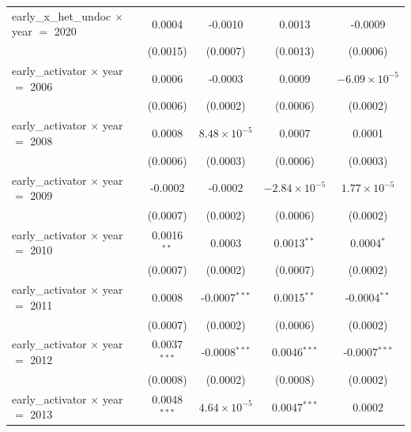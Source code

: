 \begin{tabular}{lcccc}
   early\_x\_het\_undoc $\times$ year $=$ 2020     & 0.0004             & -0.0010                   & 0.0013                 & -0.0009\\   
                                                   & (0.0015)           & (0.0007)                  & (0.0013)               & (0.0006)\\   
   early\_activator $\times$ year $=$ 2006         & 0.0006             & -0.0003                   & 0.0009                 & $-6.09\times 10^{-5}$\\    
                                                   & (0.0006)           & (0.0002)                  & (0.0006)               & (0.0002)\\   
   early\_activator $\times$ year $=$ 2008         & 0.0008             & $8.48\times 10^{-5}$      & 0.0007                 & 0.0001\\   
                                                   & (0.0006)           & (0.0003)                  & (0.0006)               & (0.0003)\\   
   early\_activator $\times$ year $=$ 2009         & -0.0002            & -0.0002                   & $-2.84\times 10^{-5}$  & $1.77\times 10^{-5}$\\    
                                                   & (0.0007)           & (0.0002)                  & (0.0006)               & (0.0002)\\   
   early\_activator $\times$ year $=$ 2010         & 0.0016$^{**}$      & 0.0003                    & 0.0013$^{**}$          & 0.0004$^{*}$\\   
                                                   & (0.0007)           & (0.0002)                  & (0.0007)               & (0.0002)\\   
   early\_activator $\times$ year $=$ 2011         & 0.0008             & -0.0007$^{***}$           & 0.0015$^{**}$          & -0.0004$^{**}$\\   
                                                   & (0.0007)           & (0.0002)                  & (0.0006)               & (0.0002)\\   
   early\_activator $\times$ year $=$ 2012         & 0.0037$^{***}$     & -0.0008$^{***}$           & 0.0046$^{***}$         & -0.0007$^{***}$\\   
                                                   & (0.0008)           & (0.0002)                  & (0.0008)               & (0.0002)\\   
   early\_activator $\times$ year $=$ 2013         & 0.0048$^{***}$     & $4.64\times 10^{-5}$      & 0.0047$^{***}$         & 0.0002\\   

\end{tabular}
